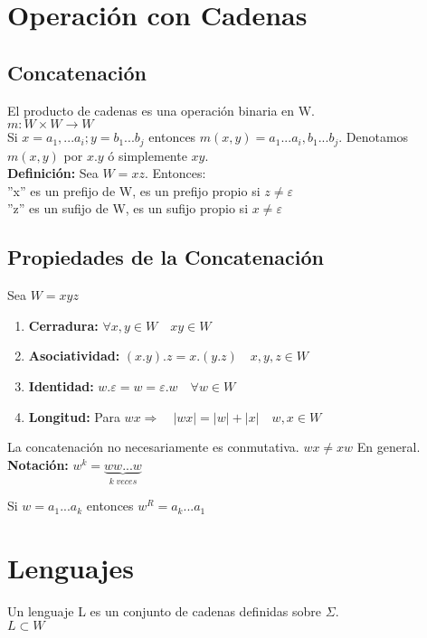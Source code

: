 \section{Operación con Cadenas}
\subsection{Concatenación}
El producto de cadenas es una operación binaria en W.\\
$m:W\times W \rightarrow W$\\
Si $x=a_1,...a_i; y=b_1...b_j$ entonces $m(x,y)=a_1...a_i,b_1...b_j$. Denotamos $m(x,y)$ por $x.y$ ó simplemente $xy$.\\

\textbf{Definición: }Sea $W=xz$. Entonces:\\
''x'' es un prefijo de W, es un prefijo propio si $z\not= \varepsilon$\\
''z'' es un sufijo de W, es un sufijo propio si $x\not=\varepsilon$

\subsection{Propiedades de la Concatenación}
Sea $W=xyz$
\begin{enumerate}
\item \textbf{Cerradura: }$\forall x, y\in W \quad xy\in W$
\item \textbf{Asociatividad: }$(x.y).z=x.(y.z) \quad x,y,z\in W$
\item \textbf{Identidad: }$w.\varepsilon = w = \varepsilon .w \quad \forall w\in W$
\item \textbf{Longitud: }Para $wx \Rightarrow \quad |wx|=|w|+|x| \quad w,x \in W$
\end{enumerate}
La concatenación no necesariamente es conmutativa. $wx\not=xw$ En general.\\
\textbf{Notación: }$w^k=\underbrace{ww...w}_{k\; veces}$

Si $w=a_1...a_k$ entonces $w^R=a_k...a_1$

\section{Lenguajes}
Un lenguaje L es un conjunto de cadenas definidas sobre $\Sigma$.\\
$L\subset W$\\


